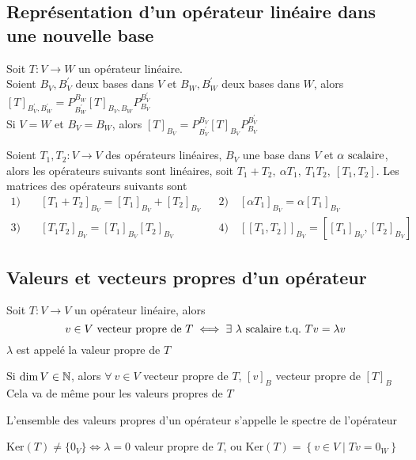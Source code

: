 \subsection{Représentation d'un opérateur linéaire dans une nouvelle base}
\begin{theorem}
    Soit $T\colon V \to W$ un opérateur linéaire. \\
    Soient $B_V, B_V^\prime$ deux bases dans $V$ et $B_W, B_W^\prime$ deux bases dans $W$, alors
    $[T]_{B_V^\prime, B_W^\prime} = P_{B_W^\prime}^{B_W} [T]_{B_V, B_W} P^{B_V^\prime}_{B_V}$ \\
    Si $V = W$ et $B_V = B_W$, alors $[T]_{B_V} = P_{B_V^\prime}^{B_V} [T]_{B_V} P^{B_V^\prime}_{B_V}$
\end{theorem}
\begin{theorem}
    Soient $T_1, T_2 \colon V \to V$ des opérateurs linéaires, $B_V$ une base dans $V$ et $\alpha \text{ scalaire}$, alors 
    les opérateurs suivants sont linéaires, soit $T_1 + T_2, \ \alpha T_1, \ T_1T_2, \ [T_1, T_2]$.
    Les matrices des opérateurs suivants sont 
    \begin{align*}
        1) \quad &[T_1 + T_2]_{B_V} = [T_1]_{B_V} + [T_2]_{B_V}& &2) \quad [\alpha T_1]_{B_V} = \alpha [T_1]_{B_V} \\
        3) \quad &[T_1T_2]_{B_V} = [T_1]_{B_V}[T_2]_{B_V}& &4) \quad \left[[T_1, T_2]\right]_{B_V} = \left[[T_1]_{B_V}, [T_2]_{B_V}\right]
    \end{align*}
\end{theorem}

\subsection{Valeurs et vecteurs propres d'un opérateur}
\begin{definition}
    Soit $T\colon V \to V$ un opérateur linéaire, alors 
    \[v \in V \ \text{vecteur propre de} \ T \iff \exists \ \scalaire{\lambda} \ \text{t.q.} \ Tv = \lambda v\]
    $\lambda$ est appelé la valeur propre de $T$
\end{definition}
\begin{theorem}
    Si $\dim V \in \mathbb{N}$, alors $\forall \ v \in V$ vecteur propre de $T$, $[v]_B$ vecteur propre de $[T]_B$ \\
    Cela va de même pour les valeurs propres de $T$
\end{theorem}
\begin{definition}
    L'ensemble des valeurs propres d'un opérateur s'appelle le spectre de l'opérateur
\end{definition}
\begin{theorem}
   $\text{Ker}(T) \neq \{0_V\} \iff \lambda = 0$ valeur propre de $T$, ou $\text{Ker}(T) = \left\{ v \in V \mid Tv = 0_W \right\}$
\end{theorem}